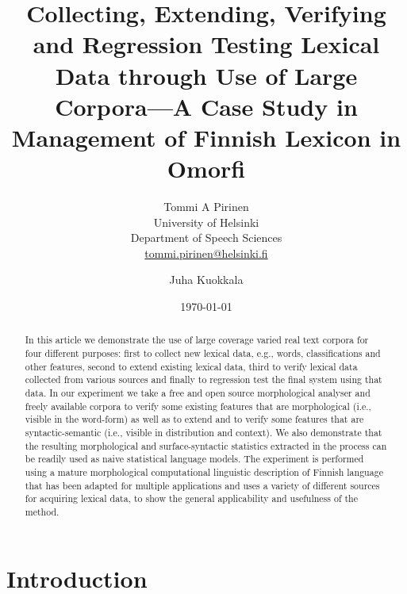 \documentclass[a5paper]{article}
\title{Collecting, Extending, Verifying and Regression Testing Lexical Data through
Use of Large Corpora---A Case Study in Management of Finnish Lexicon in Omorfi}
\author{
Tommi A Pirinen\\
University of Helsinki\\
Department of Speech Sciences\\
\url{tommi.pirinen@helsinki.fi}
\and
Juha Kuokkala}
\date{\today}
\begin{document}
\maketitle

\begin{abstract} 
    
    In this article we demonstrate the use of large coverage varied real text
    corpora for four different purposes: first to collect new lexical data,
    e.g., words, classifications and other features, second to extend existing
    lexical data, third to verify lexical data collected from various sources
    and finally to regression test the final system using that data.  In our
    experiment we take a free and open source morphological analyser and freely
    available corpora to verify some existing features that are morphological
    (i.e., visible in the word-form) as well as to extend and to verify some
    features that are syntactic-semantic (i.e., visible in distribution and
    context). We also demonstrate that the resulting morphological and
    surface-syntactic statistics extracted in the process can be readily used
    as naive statistical language models. The experiment is performed using a
    mature morphological computational linguistic description of Finnish
    language that has been adapted for multiple applications and uses a variety
    of different sources for acquiring lexical data, to show the general
    applicability and usefulness of the method.

\end{abstract}

\section{Introduction}
\label{sec:introduction}
\end{document}
